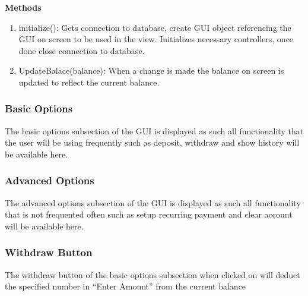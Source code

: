 \documentclass[12pt]{article}
\begin{document}

\textbf{Methods}\\
\vspace*{-0.2in}
\begin{enumerate}
  \item initialize(): Gets connection to database, create GUI object referencing the GUI on screen to be used in the view. Initializes necessary controllers, once done close connection to database.
  \item UpdateBalace(balance): When a change is made the balance on screen is updated to reflect the current balance.
\end{enumerate}

\subsubsection{Basic Options}
The basic options subsection of the GUI is displayed as such all functionality that the user will be using frequently such as deposit, withdraw and show history will be available here.


\subsubsection{Advanced Options}
The advanced options subsection of the GUI is displayed as such all functionality that is not frequented often such as setup recurring payment and clear account will be available here.


\subsubsection{Withdraw Button}
The withdraw button of the basic options subsection when clicked on will deduct the specified number in “Enter Amount” from the current balance
\end{document}
